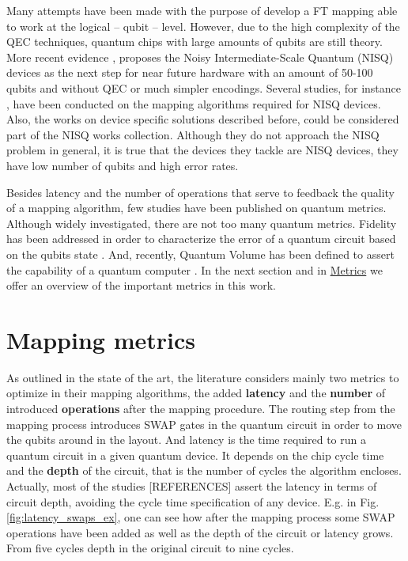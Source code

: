 Many attempts have been made \cite{Dousti_2014,Heckey_2015,hwang18:hierar_system_mappin_large_scale,murphy18:contr,Lao_2018} with the purpose of develop a FT mapping able to work at the logical -- qubit -- level.
However, due to the high complexity of the QEC techniques, quantum chips with large amounts of qubits are still theory.
More recent evidence \cite{Preskill_2018}, proposes the Noisy Intermediate-Scale Quantum (NISQ) devices as the next step for near future hardware with an amount of 50-100 qubits and without QEC or much simpler encodings.
Several studies, for instance \cite{tannu18:case_variab_aware_polic_nisq,paler18:nisq,paler18:influen_initial_qubit_placem_durin}, have been conducted on the mapping algorithms required for NISQ devices.
Also, the works on device specific solutions \cite{zulehner17:effic_method_mappin_quant_circuit,Siraichi_2018,mckay18:qiskit_backen_specif_openq_openp_exper,Dueck_2018,Venturelli_2018} described before, could be considered part of the NISQ works collection.
Although they do not approach the NISQ problem in general, it is true that the devices they tackle are NISQ devices, they have low number of qubits and high error rates.

Besides latency and the number of operations that serve to feedback the quality of a mapping algorithm, few studies have been published on quantum metrics.
Although widely investigated, there are not too many quantum metrics.
Fidelity has been addressed in order to characterize the error of a quantum circuit based on the qubits state \cite{Jozsa_1994,Nielsen_2009}.
And, recently, Quantum Volume has been defined to assert the capability of a quantum computer \cite{Moll_2018}.
In the next section and in \href{chapter-3.org}{Metrics} we offer an overview of the important metrics in this work.

\section*{Mapping metrics}
\label{sec:org41a46a6}

As outlined in the state of the art, the literature considers mainly two metrics to optimize in their mapping algorithms, the added \textbf{latency} and the \textbf{number} of introduced \textbf{operations} after the mapping procedure.
The routing step from the mapping process introduces SWAP gates in the quantum circuit in order to move the qubits around in the layout.
And latency is the time required to run a quantum circuit in a given quantum device.
It depends on the chip cycle time and the \textbf{depth} of the circuit, that is the number of cycles the algorithm encloses.
Actually, most of the studies [REFERENCES] assert the latency in terms of circuit depth, avoiding the cycle time specification of any device.
E.g. in Fig. \ref{fig:latency_swaps_ex}, one can see how after the mapping process some SWAP operations have been added as well as the depth of the circuit or latency grows.
From five cycles depth in the original circuit to nine cycles.


